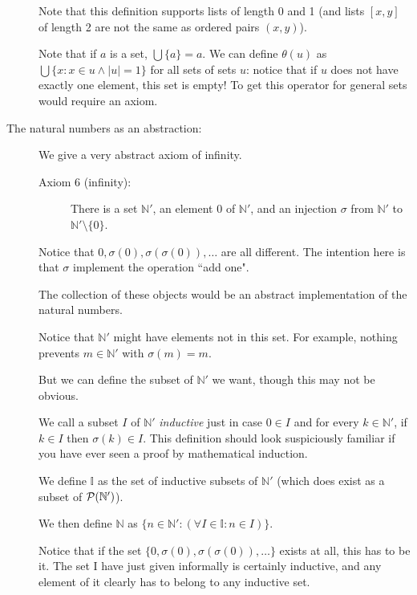 \documentclass[12pt]{article}
\begin{document}
\begin{description}
Note that this definition supports lists of length 0 and 1 (and lists $[x,y]$ of length 2 are not the same as ordered pairs $(x,y)$).

Note that if $a$ is a set, $\bigcup \{a\} = a$.  We can define $\theta(u)$ as $\bigcup \{x:x \in u \wedge |u|=1\}$ for all sets of sets $u$:  notice that if $u$ does not have exactly one element, this set is empty!  To get this operator for general sets would require an axiom.

\item[The natural numbers as an abstraction:]

We give a very abstract axiom of infinity.

\begin{description}

\item[Axiom 6 (infinity):]  There is a set $\mathbb N'$, an element 0 of $\mathbb N'$, and an injection $\sigma$ from $\mathbb N'$ to $\mathbb N' \setminus \{0\}$.

\end{description}

Notice that $0, \sigma(0), \sigma(\sigma(0)),\ldots$ are all different.  The intention here is that $\sigma$ implement the operation ``add one".

The collection of these objects would be an abstract implementation of the natural numbers.

Notice that $\mathbb N'$ might have elements not in this set.  For example, nothing prevents $m \in \mathbb N'$ with
$\sigma(m)=m$.

But we can define the subset of $\mathbb N'$ we want, though this may not be obvious.

We call a subset $I$ of $\mathbb N'$ {\em inductive\/} just in case $0 \in I$ and for every $k \in \mathbb N'$, if
$k \in I$ then $\sigma(k) \in I$.  This definition should look suspiciously familiar if you have ever seen a proof by mathematical induction.

We define $\mathbb I$ as the set of inductive subsets of $\mathbb N'$ (which does exist as a subset of ${\cal P}(\mathbb N')$).

We then define $\mathbb N$ as $\{n \in \mathbb N':(\forall I \in {\mathbb I}:n \in I)\}$.

Notice that if the set $\{0, \sigma(0), \sigma(\sigma(0)),\ldots\}$  exists at all, this has to be it.  The set I have just given informally is certainly inductive, and any element of it clearly has to belong to any inductive set.


\end{description}
\end{document}
